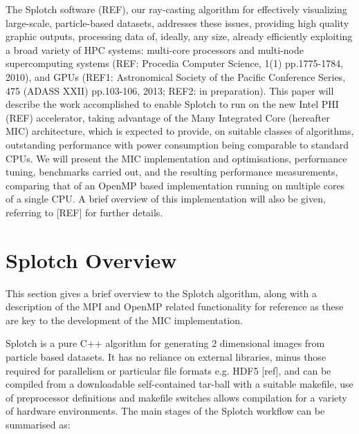 \documentclass{easychair}
\begin{document}
The Splotch software (REF), our ray-casting algorithm for
effectively visualizing large-scale, particle-based datasets, addresses these issues, 
providing high quality graphic outputs, processing data of, ideally, any size, already
efficiently exploiting a broad variety of HPC systems: multi-core processors and multi-node supercomputing systems 
(REF: Procedia Computer Science, 1(1) pp.1775-1784, 2010), and GPUs (REF1: Astronomical Society of the Pacific Conference 
Series, 475 (ADASS XXII) pp.103-106, 2013; REF2: in preparation). 
This paper will describe the work accomplished to enable Splotch to 
run on the new Intel PHI (REF) accelerator, taking advantage of the Many Integrated Core (hereafter MIC) architecture,
which is expected to provide, on suitable classes of algorithms, outstanding performance 
with power consumption being comparable to standard CPUs. 
We will present the MIC implementation and optimisations, performance tuning,
benchmarks carried out, and the resulting performance measurements, comparing that of an OpenMP
based implementation running on multiple cores of a single CPU. 
A brief overview of this implementation will also be given, referring to [REF] for further details.

\section{Splotch Overview}
\label{sect:overview}

This section gives a brief overview to the Splotch algorithm, along with a description of the MPI and OpenMP related 
functionality for reference as these are key to the development of the MIC implementation.

Splotch is a pure C++ algorithm for generating 2 dimensional images from particle based datasets. It has no reliance 
on external libraries, minus those required for parallelism or particular file formats e.g. HDF5 [ref], and can be 
compiled from a downloadable self-contained tar-ball with a suitable makefile, use of preprocessor definitions and 
makefile switches allows compilation for a variety of hardware environments. The main stages of the Splotch workflow 
can be summarised as:
\end{document}

